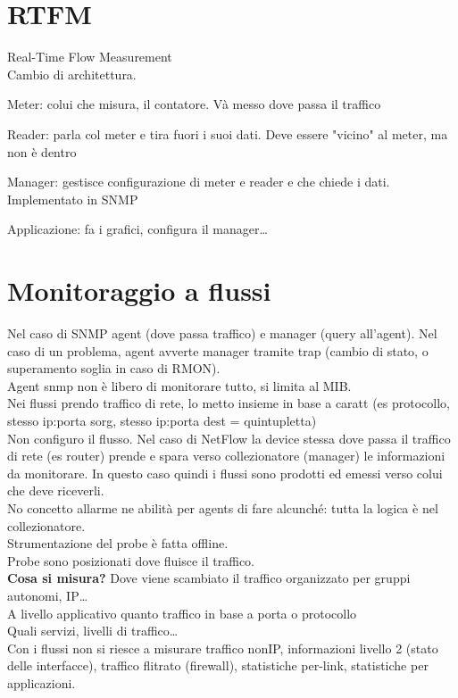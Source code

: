 \documentclass[10pt]{book}
\begin{document}
\section{RTFM} Real-Time Flow Measurement\\
Cambio di architettura.
\begin{list}{}{}
	\item Meter: colui che misura, il contatore. Và messo dove passa il traffico
	\item Reader: parla col meter e tira fuori i suoi dati. Deve essere "vicino" al meter, ma non è dentro
	\item Manager: gestisce configurazione di meter e reader e che chiede i dati. Implementato in SNMP
	\item Applicazione: fa i grafici, configura il manager\ldots
\end{list}
\section{Monitoraggio a flussi}
Nel caso di SNMP agent (dove passa traffico) e manager (query all'agent). Nel caso di un problema, agent avverte manager tramite trap (cambio di stato, o superamento soglia in caso di RMON).\\
Agent snmp non è libero di monitorare tutto, si limita al MIB.\\
Nei flussi prendo traffico di rete, lo metto insieme in base a caratt (es protocollo, stesso ip:porta sorg, stesso ip:porta dest = quintupletta)\\
Non configuro il flusso. Nel caso di NetFlow la device stessa dove passa il traffico di rete (es router) prende e spara verso collezionatore (manager) le informazioni da monitorare. In questo caso quindi i flussi sono prodotti ed emessi verso colui che deve riceverli.\\
No concetto allarme ne abilità per agents di fare alcunché: tutta la logica è nel collezionatore.\\
Strumentazione del probe è fatta offline.\\
Probe sono posizionati dove fluisce il traffico.\\
\textbf{Cosa si misura?} Dove viene scambiato il traffico organizzato per gruppi autonomi, IP\ldots\\
A livello applicativo quanto traffico in base a porta o protocollo\\
Quali servizi, livelli di traffico\ldots\\
Con i flussi non si riesce a misurare traffico nonIP, informazioni livello 2 (stato delle interfacce), traffico flitrato (firewall), statistiche per-link, statistiche per applicazioni.
\end{document}
